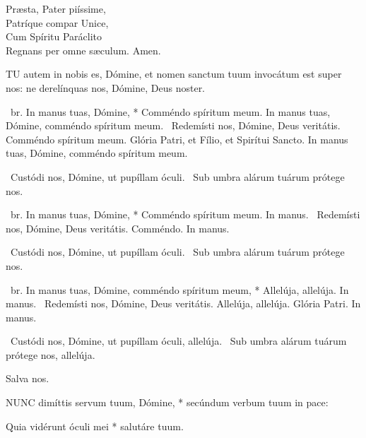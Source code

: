 Præsta, Pater piíssime,\\
Patríque compar Unice,\\
Cum Spíritu Paráclito\\
Regnans per omne sæculum. Amen.



\lettrine[lines=2]{T}{U} autem in nobis es, Dómine, et nomen sanctum tuum invocátum est super nos: ne derelínquas nos, Dómine, Deus noster.

\R\ br. In manus tuas, Dómine, * Comméndo spíritum meum. In manus tuas, Dómine, comméndo spíritum meum. \V\ Redemísti nos, Dómine, Deus veritátis. Comméndo spíritum meum. Glória Patri, et Fílio, et Spirítui Sancto. In manus tuas, Dómine, comméndo spíritum meum.

\V\ Custódi nos, Dómine, ut pupíllam óculi. \R\ Sub umbra alárum tuárum prótege nos.


\R\ br. In manus tuas, Dómine, * Comméndo spíritum meum. In manus. \V\ Redemísti nos, Dómine, Deus veritátis. Comméndo. In manus.

\V\ Custódi nos, Dómine, ut pupíllam óculi. \R\ Sub umbra alárum tuárum prótege nos.


\R\ br. In manus tuas, Dómine, comméndo spíritum meum, * Allelúja, allelúja. In manus. \V\ Redemísti nos, Dómine, Deus veritátis. Allelúja, allelúja. Glória Patri. In manus.

\V\ Custódi nos, Dómine, ut pupíllam óculi, allelúja. \R\ Sub umbra alárum tuárum prótege nos, allelúja.


 Salva nos.


\lettrine[lines=2]{N}{UNC} dimíttis servum tuum, Dómine, * secúndum verbum tuum in pace:

Quia vidérunt óculi mei * salutáre tuum.

